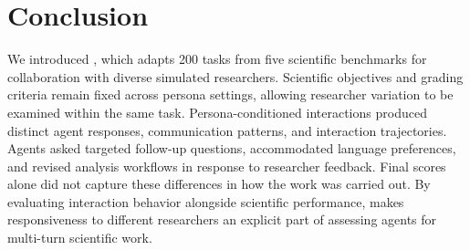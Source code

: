 \section{Conclusion}
\label{sec:conclusion}

We introduced \benchmark, which adapts 200 tasks from five scientific
benchmarks for collaboration with diverse simulated researchers.
Scientific objectives and grading criteria remain fixed across persona
settings, allowing researcher variation to be examined within the same task.
Persona-conditioned interactions produced distinct agent responses,
communication patterns, and interaction trajectories. Agents asked targeted
follow-up questions, accommodated language preferences, and revised analysis
workflows in response to researcher feedback. Final scores alone did not
capture these differences in how the work was carried out. By evaluating
interaction behavior alongside scientific performance, \benchmark makes
responsiveness to different researchers an explicit part of assessing agents
for multi-turn scientific work.

